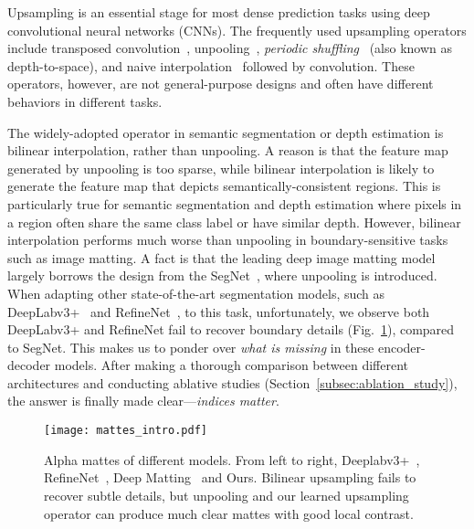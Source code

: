 \documentclass[10pt,twocolumn,letterpaper]{article}
\begin{document}
Upsampling is an essential stage for most dense prediction tasks using deep convolutional neural networks (CNNs). The frequently used upsampling operators include transposed convolution~\cite{zeiler2014visualizing,long2015fully}, unpooling~\cite{badrinarayanan2017segnet}, \textit{periodic shuffling}~\cite{shi2016real} (also known as depth-to-space), and naive interpolation~\cite{lin2017refine,chen18v3} followed by convolution. These operators, however, are not general-purpose designs and often have different behaviors in different tasks.

The widely-adopted operator in semantic segmentation or depth estimation is bilinear interpolation, rather than unpooling. A reason is that the feature map generated by unpooling is too sparse, while bilinear interpolation is likely to generate the feature map that depicts semantically-consistent regions. This is particularly true for semantic segmentation and depth estimation where pixels in a region often share the same class label or have similar depth. However, bilinear interpolation performs much worse than unpooling in boundary-sensitive tasks such as image matting. A fact is that the leading deep image matting model~\cite{xu2017deep} largely borrows the design from the SegNet~\cite{badrinarayanan2017segnet}, where unpooling is introduced. When adapting other state-of-the-art segmentation models, such as DeepLabv3+~\cite{chen18v3} and RefineNet~\cite{lin2017refine}, to this task, unfortunately, we observe both DeepLabv3+ and RefineNet fail to recover boundary details (Fig.~\ref{fig:alpha_mattes}), compared to SegNet. This makes us to ponder over \textit{what is missing} in these encoder-decoder models. After making a thorough comparison between different architectures and conducting ablative studies (Section~\ref{subsec:ablation_study}), the answer is finally made clear---\textit{indices matter}.

\begin{figure}[t]
	\captionsetup{font=small,singlelinecheck=true}
	\begin{center}
		\texttt{[image: mattes\_intro.pdf]}
	\end{center}
\caption{Alpha mattes of different models. From left to right, Deeplabv3+~\cite{chen18v3}, RefineNet~\cite{lin2017refine}, Deep Matting~\cite{xu2017deep} and Ours. Bilinear upsampling fails to recover subtle details, but unpooling and our learned upsampling operator can produce much clear mattes with good local contrast.}
	\label{fig:alpha_mattes}
\end{figure}
\end{document}

